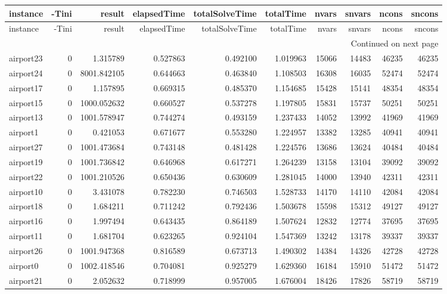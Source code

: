\begin{longtable}{|l|r|r|r|r|r|r|r|r|r|}
\toprule
instance & -Tini & result & elapsedTime & totalSolveTime & totalTime & nvars & snvars & ncons & sncons \\
\midrule
\endfirsthead
\toprule
instance & -Tini & result & elapsedTime & totalSolveTime & totalTime & nvars & snvars & ncons & sncons \\
\midrule
\endhead
\midrule
\multicolumn{10}{r}{Continued on next page} \\
\midrule
\endfoot
\bottomrule
\endlastfoot
airport23 & 0 & 1.315789 & 0.527863 & 0.492100 & 1.019963 & 15066 & 14483 & 46235 & 46235 \\
airport24 & 0 & 8001.842105 & 0.644663 & 0.463840 & 1.108503 & 16308 & 16035 & 52474 & 52474 \\
airport17 & 0 & 1.157895 & 0.669315 & 0.485370 & 1.154685 & 15428 & 15141 & 48354 & 48354 \\
airport15 & 0 & 1000.052632 & 0.660527 & 0.537278 & 1.197805 & 15831 & 15737 & 50251 & 50251 \\
airport13 & 0 & 1001.578947 & 0.744274 & 0.493159 & 1.237433 & 14052 & 13992 & 41969 & 41969 \\
airport1 & 0 & 0.421053 & 0.671677 & 0.553280 & 1.224957 & 13382 & 13285 & 40941 & 40941 \\
airport27 & 0 & 1001.473684 & 0.743148 & 0.481428 & 1.224576 & 13686 & 13624 & 40484 & 40484 \\
airport19 & 0 & 1001.736842 & 0.646968 & 0.617271 & 1.264239 & 13158 & 13104 & 39092 & 39092 \\
airport22 & 0 & 1001.210526 & 0.650436 & 0.630609 & 1.281045 & 14000 & 13940 & 42311 & 42311 \\
airport10 & 0 & 3.431078 & 0.782230 & 0.746503 & 1.528733 & 14170 & 14110 & 42084 & 42084 \\
airport18 & 0 & 1.684211 & 0.711242 & 0.792436 & 1.503678 & 15598 & 15312 & 49127 & 49127 \\
airport16 & 0 & 1.997494 & 0.643435 & 0.864189 & 1.507624 & 12832 & 12774 & 37695 & 37695 \\
airport11 & 0 & 1.681704 & 0.623265 & 0.924104 & 1.547369 & 13242 & 13178 & 39337 & 39337 \\
airport26 & 0 & 1001.947368 & 0.816589 & 0.673713 & 1.490302 & 14384 & 14326 & 42728 & 42728 \\
airport0 & 0 & 1002.418546 & 0.704081 & 0.925279 & 1.629360 & 16184 & 15910 & 51472 & 51472 \\
airport21 & 0 & 2.052632 & 0.718999 & 0.957005 & 1.676004 & 18426 & 17826 & 58719 & 58719 \\

\end{longtable}
